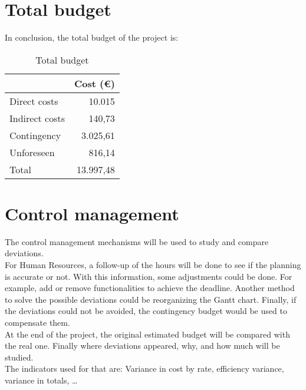 \section{Total budget}
In conclusion, the total budget of the project is:
\begin{table}[h!]
	\centering
	\begin{tabular}{l|r|}
		\cline{2-2}
		& \multicolumn{1}{l|}{Cost (€)} \\ \hline
		\multicolumn{1}{|l|}{Direct costs} & 10.015\\ \hline
		\multicolumn{1}{|l|}{Indirect costs}& 140,73\\ \hline
		\multicolumn{1}{|l|}{Contingency} & 3.025,61\\ \hline
		\multicolumn{1}{|l|}{Unforeseen} & 816,14\\ \hline\hline
		\multicolumn{1}{|l|}{Total} & 13.997,48\\ \hline
	\end{tabular}
	\caption{Total budget}
	\label{TotalBudget}
\end{table}
\section{Control management}
The control management mechanisms will be used to study and compare deviations.\\

For Human Resources, a follow-up of the hours will be done to see if the planning is accurate or not. With this information, some adjustments could be done. For example, add or remove functionalities to achieve the deadline. Another method to solve the possible deviations could be reorganizing the Gantt chart. Finally, if the deviations could not be avoided, the contingency budget would be used to compensate them.\\

At the end of the project, the original estimated budget will be compared with the real one. Finally where deviations appeared, why, and how much will be studied. \\

The indicators used for that are: Variance in cost by rate, efficiency variance, variance in totals, \ldots